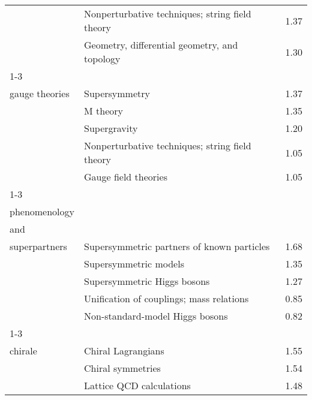 \begin{longtable}[H]{p{}|p{}|p{}}
                                                               & Nonperturbative techniques; string field theory &  1.37 \\
                                                               & Geometry, differential geometry, and topology &  1.30 \\
\cline{1-3}
\multirow{5}{*}{\begin{tabular}{l}Supersymmetric\\ gauge theories\end{tabular}} & Supersymmetry &  1.37 \\
                                                               & M theory &  1.35 \\
                                                               & Supergravity &  1.20 \\
                                                               & Nonperturbative techniques; string field theory &  1.05 \\
                                                               & Gauge field theories &  1.05 \\
\cline{1-3}
\multirow{5}{*}{\begin{tabular}{l}Susy\\ phenomenology\\ and\\ superpartners\end{tabular}} & Supersymmetric partners of known particles &  1.68 \\
                                                               & Supersymmetric models &  1.35 \\
                                                               & Supersymmetric Higgs bosons &  1.27 \\
                                                               & Unification of couplings; mass relations &  0.85 \\
                                                               & Non-standard-model Higgs bosons &  0.82 \\
\cline{1-3}
\multirow{5}{*}{\begin{tabular}{l}Symétrie\\ chirale\end{tabular}} & Chiral Lagrangians &  1.55 \\
                                                               & Chiral symmetries &  1.54 \\
                                                               & Lattice QCD calculations &  1.48 \\

\end{longtable}
